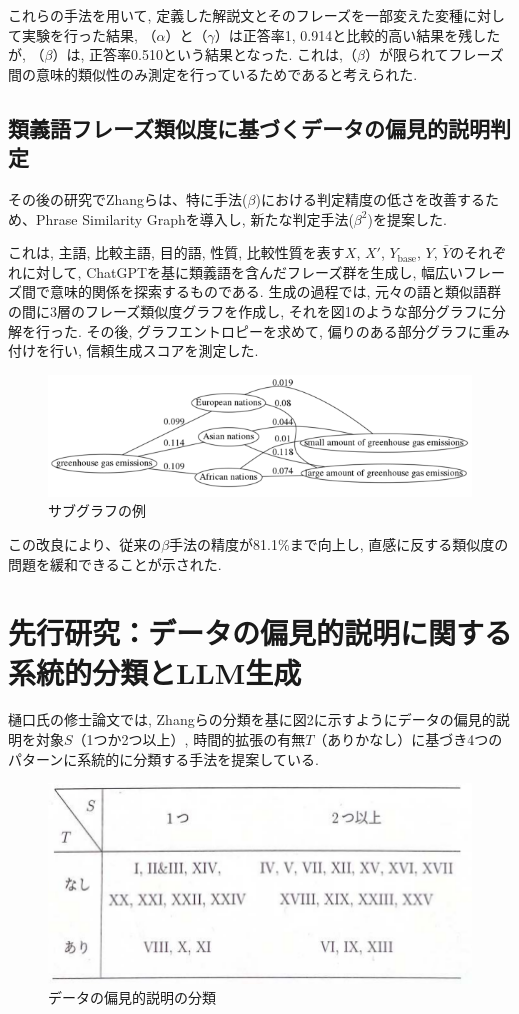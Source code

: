 \documentclass[dvipdfmx]{jsarticle}
\begin{document}
これらの手法を用いて, 定義した解説文とそのフレーズを一部変えた変種に対して実験を行った結果, （$\alpha$）と（$\gamma$）は正答率1, 0.914と比較的高い結果を残したが, （$\beta$）は, 正答率0.510という結果となった. これは,（$\beta$）が限られてフレーズ間の意味的類似性のみ測定を行っているためであると考えられた.

\subsection{類義語フレーズ類似度に基づくデータの偏見的説明判定}
その後の研究でZhangらは、特に手法($\beta$)における判定精度の低さを改善するため、Phrase Similarity Graphを導入し, 新たな判定手法(${\beta}^2$)を提案した\cite{zhang2023}.
\vspace{1em}

これは, 主語, 比較主語, 目的語, 性質, 比較性質を表す$X$, $X'$, ${Y}_{\text{base}}$, $Y$, $\bar{Y}$のそれぞれに対して, ChatGPTを基に類義語を含んだフレーズ群を生成し, 幅広いフレーズ間で意味的関係を探索するものである. 生成の過程では, 元々の語と類似語群の間に3層のフレーズ類似度グラフを作成し, それを図1のような部分グラフに分解を行った. その後, グラフエントロピーを求めて, 偏りのある部分グラフに重み付けを行い, 信頼生成スコアを測定した.

\begin{figure}[H]
  \centering
  \includegraphics[width=0.8\linewidth]{01.png}
  \caption{サブグラフの例}
  \label{fig:subgraph}
\end{figure}

この改良により、従来の$\beta$手法の精度が81.1\%まで向上し, 直感に反する類似度の問題を緩和できることが示された.

\section{先行研究：データの偏見的説明に関する系統的分類とLLM生成}

樋口氏の修士論文では, Zhangらの分類を基に図2に示すようにデータの偏見的説明を対象$S$（1つか2つ以上）, 時間的拡張の有無$T$（ありかなし）に基づき4つのパターンに系統的に分類する手法を提案している\cite{higuchi2024}.

\begin{figure}[H]
  \centering
  \includegraphics[width=0.6\linewidth]{02.png}
  \caption{データの偏見的説明の分類}
  \label{fig:pattern2}
\end{figure}
\end{document}
